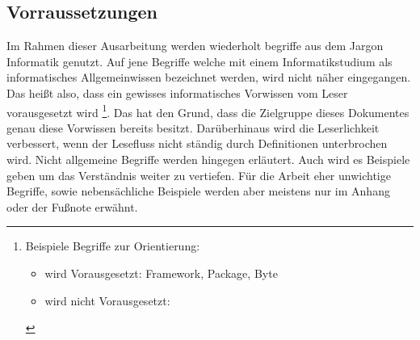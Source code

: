 \subsection{Vorraussetzungen} \myCheckmark
Im Rahmen dieser Ausarbeitung werden wiederholt begriffe aus dem Jargon Informatik genutzt. Auf jene Begriffe welche mit einem Informatikstudium als informatisches Allgemeinwissen bezeichnet werden, wird nicht näher eingegangen. Das heißt also, dass ein gewisses informatisches Vorwissen vom Leser vorausgesetzt wird%
\footnote{Beispiele Begriffe zur Orientierung:
	\begin{itemize}[noitemsep,topsep=0pt,parsep=0pt,partopsep=0pt]
		\item wird Vorausgesetzt: Framework, Package, Byte
		\item wird nicht Vorausgesetzt: \myTodo %
	\end{itemize}
	\nointerlineskip %
}. \newline%
Das hat den Grund, dass die Zielgruppe dieses Dokumentes genau diese Vorwissen bereits besitzt. Darüberhinaus wird die Leserlichkeit verbessert, wenn der Lesefluss nicht ständig durch Definitionen unterbrochen wird. \newline%
Nicht allgemeine Begriffe werden hingegen erläutert. Auch wird es Beispiele geben um das Verständnis weiter zu vertiefen.\newline%
Für die Arbeit eher unwichtige Begriffe, sowie nebensächliche Beispiele werden aber meistens nur im Anhang oder der Fußnote erwähnt.
